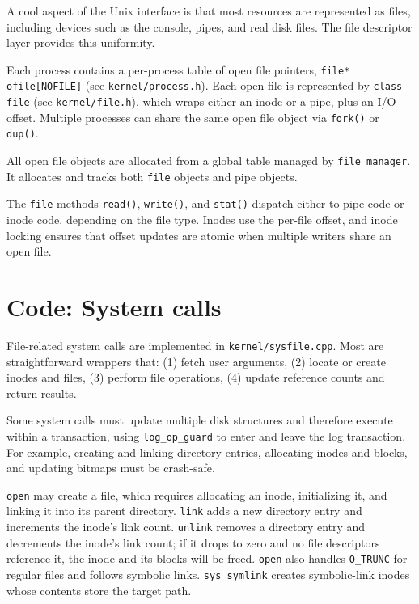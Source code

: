 A cool aspect of the Unix interface is that most resources are represented as files, including devices such as
the console, pipes, and real disk files. The file descriptor layer provides this uniformity.

Each process contains a per-process table of open file pointers,
\lstinline{file* ofile[NOFILE]} (see \texttt{kernel/process.h}).
Each open file is represented by \lstinline{class file} (see \texttt{kernel/file.h}),
which wraps either an inode or a pipe, plus an I/O offset.
Multiple processes can share the same open file object via \lstinline{fork()} or \lstinline{dup()}.

All open file objects are allocated from a global table managed by
\lstinline{file_manager}.
It allocates and tracks both
\lstinline{file}
objects and pipe objects.

The \lstinline{file} methods \lstinline{read()}, \lstinline{write()}, and \lstinline{stat()}
dispatch either to pipe code or inode code, depending on the file type.
Inodes use the per-file offset, and inode locking ensures that offset updates are atomic when multiple
writers share an open file.

\section{Code: System calls}

File-related system calls are implemented in \texttt{kernel/sysfile.cpp}.
Most are straightforward wrappers that:
(1) fetch user arguments,
(2) locate or create inodes and files,
(3) perform file operations,
(4) update reference counts and return results.

Some system calls must update multiple disk structures and therefore execute within a transaction,
using \lstinline{log_op_guard} to enter and leave the log transaction.
For example, creating and linking directory entries, allocating inodes and blocks, and updating bitmaps
must be crash-safe.

\lstinline{open} may create a file, which requires allocating an inode, initializing it, and linking it
into its parent directory. \lstinline{link} adds a new directory entry and increments the inode’s link count.
\lstinline{unlink} removes a directory entry and decrements the inode’s link count; if it drops to zero and
no file descriptors reference it, the inode and its blocks will be freed.
\lstinline{open} also handles \lstinline{O_TRUNC} for regular files and follows symbolic links.
\lstinline{sys_symlink} creates symbolic-link inodes whose contents store the target path.

